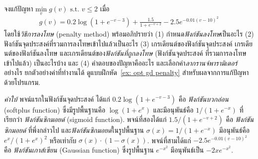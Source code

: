 \begin{Exercise}
	\label{ex: opt min problem softplus sigmoid gaussian}
	จงแก้ปัญหา
	$\underset{v}{\mathrm{min}} \; g(v)
	\mbox{ s.t. } v \leq 2$
	เมื่อ 
	\begin{eqnarray}
	g(v) = 0.2 \log(1 + e^{-v-3}) 
	+ \frac{1.5}{1 + 
		e^{-v +2}}
	-2.5 e^{-0.01 (v - 10)^2}
	\label{eq: ex opt const simple f}
	\end{eqnarray}
	โดยใช้\textit{วิธีการลงโทษ} (penalty method)
	พร้อมอภิปรายว่า
	(1) กำหนด\textit{ฟังก์ชันลงโทษ}เป็นอะไร
	(2) ฟังก์ชันจุดประสงค์ที่รวมการลงโทษเข้าไปแล้วเป็นอะไร
	(3) เกรเดียนต์ของฟังก์ชันจุดประสงค์
	เกรเดียนต์ของฟังก์ชันลงโทษ
	และเกรเดียนต์ของ\textit{ฟังก์ชันที่ถูกลงโทษ} (ฟังก์ชันจุดประสงค์ ที่รวมการลงโทษเข้าไปแล้ว)
	เป็นอะไรบ้าง
	และ (4) คำตอบของปัญหาคืออะไร
	และเลือกค่า\textit{ลากรานจ์พารามิเตอร์}อย่างไร ยกตัวอย่างค่าที่ทำงานได้
	ดูแบบฝึกหัด~\ref{ex: opt gd penalty} สำหรับผลจากการแก้ปัญหา ด้วยโปรแกรม.
	
	\textit{คำใบ้}
	พจน์แรกในฟังก์ชันจุดประสงค์
	ได้แก่ $0.2 \log(1 + e^{-v-3})$
	คือ \textit{ฟังก์ชันบวกอ่อน} (softplus function)
	ซึ่งมีรูปพื้นฐานคือ $\log(1 + e^x)$
	และมีอนุพันธ์คือ
	$1/(1 + e^{-x})$
	ที่เรียกว่า \textit{ฟังก์ชันซิกมอยด์} (sigmoid function).
	พจน์ที่สองได้แก่ $1.5/(1 + 
	e^{-v +2})$
	คือ \textit{ฟังก์ชันซิกมอยด์} 
	ที่พึ่งกล่าวไป 
	และ\textit{ฟังก์ชันซิกมอยด์}ในรูปพื้นฐาน $\sigma(x) = 1/(1 + e^{-x})$
	มีอนุพันธ์คือ
	$e^x / ( 1 + e^x)^2$
	หรือเท่ากับ $\sigma(x) \cdot (1 - \sigma(x))$.
	พจน์ที่สามได้แก่
	$-2.5 e^{-0.01 (v - 10)^2}$
	คือ \textit{ฟังก์ชันเกาส์เซียน} (Gaussian function)
	ซึ่งรูปพื้นฐาน $e^{-x^2}$
	มีอนุพันธ์เป็น $-2 x e^{-x^2}$.
	
	
	
	
\end{Exercise}



